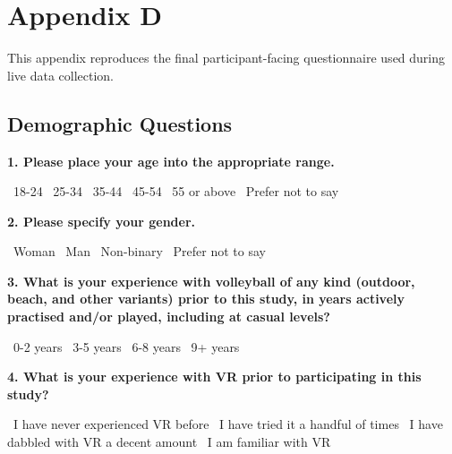 \chapter*{Appendix D}

This appendix reproduces the final participant-facing questionnaire used during live data collection.

\begingroup
\small
\setlength{\parindent}{0pt}
\setlength{\parskip}{0.5em}
\setlength{\tabcolsep}{4pt}

\newcommand{\formbox}{\fbox{\rule{0pt}{1.1ex}\rule{1.1ex}{0pt}}}
\newcommand{\formline}{\underline{\hspace{3cm}}}
\newcommand{\formanswerline}{\par\vspace{2.5em}\hrulefill\par}
\newcommand{\question}[1]{\par\medskip\textbf{#1}\par}

\section*{Demographic Questions}

\question{1. Please place your age into the appropriate range.}
\formbox\ 18-24 \hspace{2em} 
\formbox\ 25-34 \hspace{2em} 
\formbox\ 35-44 \hspace{2em} 
\formbox\ 45-54 \hspace{2em} 
\formbox\ 55 or above \hspace{2em} 
\formbox\ Prefer not to say

\question{2. Please specify your gender.}
\formbox\ Woman \hspace{2em} \formbox\ Man \hspace{2em} \formbox\ Non-binary \hspace{2em} \formbox\ Prefer not to say

\question{3. What is your experience with volleyball of any kind (outdoor, beach, and other variants) prior to this study, in years actively practised and/or played, including at casual levels?}
\formbox\ 0-2 years \hspace{2em} \formbox\ 3-5 years \hspace{2em} \formbox\ 6-8 years \hspace{2em} \formbox\ 9+ years

\question{4. What is your experience with VR prior to participating in this study?}
\formbox\ I have never experienced VR before \hspace{1em}
\formbox\ I have tried it a handful of times \hspace{1em}
\formbox\ I have dabbled with VR a decent amount \hspace{1em}
\formbox\ I am familiar with VR

